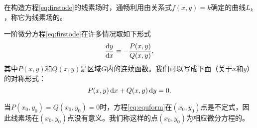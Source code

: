 在构造方程\eqref{eq:firstode}的线素场时，通畅利用由关系式$f(x,y)=k$确定的曲线$L_k$，称它为线素场的。

一阶微分方程\eqref{eq:firstode}在许多情况取如下形式
\begin{equation}\label{eq:equform}
    \frac{\mathrm{d} y}{\mathrm{d} x}=-\dfrac{P(x,y)}{Q(x,y)},
\end{equation}
其中$P(x,y)$和$Q(x,y)$是区域$G$内的连续函数。我们可以写成下面（关于$x$和$y$）的对称形式：
\begin{equation}\label{eq:equform2}
    P(x,y)\,\mathrm{d} x+Q(x,y)\,\mathrm{d} y=0.
\end{equation}

当$P(x_0,y_0)=Q(x_0,y_0)=0$时，方程\eqref{eq:equform}在$(x_0,y_0)$点是不定式，因此线素场在$(x_0,y_0)$点没有意义。我们称这样的点$(x_0,y_0)$为相应微分方程的。
